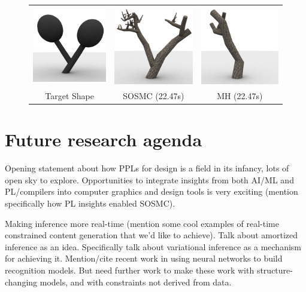 \documentclass[
10pt, %
a4paper, %
oneside, %
headinclude,footinclude, %
BCOR5mm, %
]{scrartcl}
\newcommand*{\helvetica}{\fontfamily{phv}\selectfont}
\begin{document}
\vspace{1em}
\begin{figure}[h!]
	\centering
	\begin{tabular}{ccc}
		\includegraphics[width=0.30\linewidth]{figs/sosmc/target.png} &
		\includegraphics[width=0.30\linewidth]{figs/sosmc/sosmc.png} &
		\includegraphics[width=0.30\linewidth]{figs/sosmc/mh.png} \\
		{\helvetica \scriptsize{Target Shape}} & {\helvetica \scriptsize{SOSMC (22.47s)}} & {\helvetica \scriptsize{MH (22.47s)}}
	\end{tabular}
\end{figure}



\section*{Future research agenda}

Opening statement about how PPLs for design is a field in its infancy, lots of open sky to explore. Opportunities to integrate insights from both AI/ML and PL/compilers into computer graphics and design tools is very exciting (mention specifically how PL insights enabled SOSMC).

Making inference more real-time (mention some cool examples of real-time constrained content generation that we'd like to achieve). Talk about amortized inference as an idea. Specifically talk about variational inference as a mechanism for achieving it. Mention/cite recent work in using neural networks to build recognition models. But need further work to make these work with structure-changing models, and with constraints not derived from data.
\end{document}
